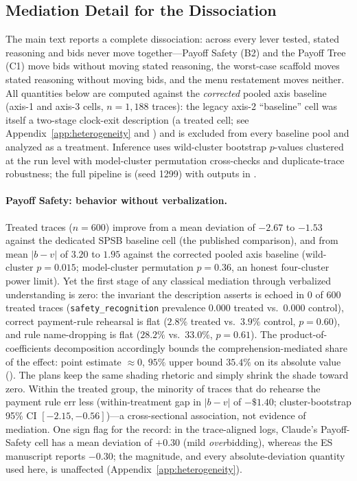 \subsection{Mediation Detail for the Dissociation}\label{app:traces-mediation}

The main text reports a complete dissociation: across every lever tested, stated reasoning and bids never move together---Payoff Safety (B2) and the Payoff Tree (C1) move bids without moving stated reasoning, the worst-case scaffold moves stated reasoning without moving bids, and the menu restatement moves neither. All quantities below are computed against the \emph{corrected} pooled axis baseline (axis-1 and axis-3 cells, $n = 1{,}188$ traces): the legacy axis-2 ``baseline'' cell was itself a two-stage clock-exit description (a treated cell; see Appendix~\ref{app:heterogeneity} and ) and is excluded from every baseline pool and analyzed as a treatment. Inference uses wild-cluster bootstrap $p$-values clustered at the run level with model-cluster permutation cross-checks and duplicate-trace robustness; the full pipeline is  (seed 1299) with outputs in .

\paragraph{Payoff Safety: behavior without verbalization.} Treated traces ($n = 600$) improve from a mean deviation of $-2.67$ to $-1.53$ against the dedicated SPSB baseline cell (the published comparison), and from mean $|b-v|$ of $3.20$ to $1.95$ against the corrected pooled axis baseline (wild-cluster $p = 0.015$; model-cluster permutation $p = 0.36$, an honest four-cluster power limit). Yet the first stage of any classical mediation through verbalized understanding is zero: the invariant the description asserts is echoed in 0 of 600 treated traces (\texttt{safety\_recognition} prevalence $0.000$ treated vs.\ $0.000$ control), correct payment-rule rehearsal is flat ($2.8\%$ treated vs.\ $3.9\%$ control, $p = 0.60$), and rule name-dropping is flat ($28.2\%$ vs.\ $33.0\%$, $p = 0.61$). The product-of-coefficients decomposition accordingly bounds the comprehension-mediated share of the effect: point estimate $\approx 0$, $95\%$ upper bound $35.4\%$ on its absolute value (). The plans keep the same shading rhetoric and simply shrink the shade toward zero. Within the treated group, the minority of traces that do rehearse the payment rule err less (within-treatment gap in $|b-v|$ of $-\$1.40$; cluster-bootstrap 95\% CI $[-2.15, -0.56]$)---a cross-sectional association, not evidence of mediation. One sign flag for the record: in the trace-aligned logs, Claude's Payoff-Safety cell has a mean deviation of $+0.30$ (mild \emph{over}bidding), whereas the ES manuscript reports $-0.30$; the magnitude, and every absolute-deviation quantity used here, is unaffected (Appendix~\ref{app:heterogeneity}).

